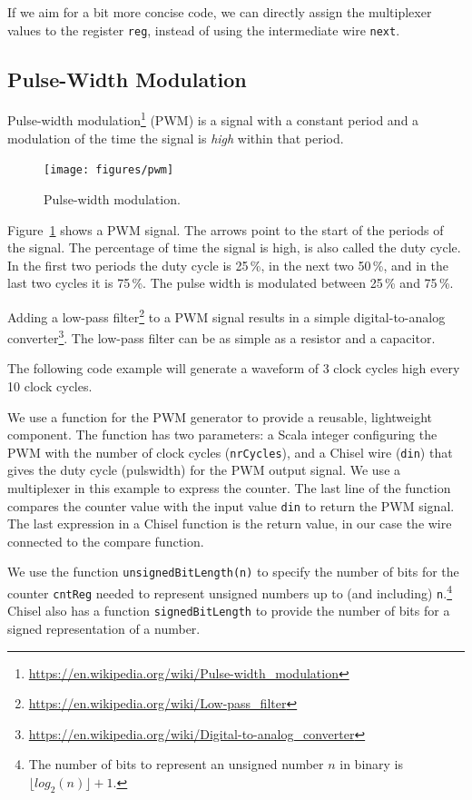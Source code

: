 \documentclass[%
    10pt,
    headinclude, footexclude,
    openright, %
    notitlepage,
    cleardoubleempty,
    headsepline,
    pointlessnumbers,
    bibtotoc, idxtotoc,
    ]{scrbook}
\newcommand{\code}[1]{{\small{\texttt{#1}}}}
\newcommand{\myref}[2]{\href{#1}{#2}}
\renewcommand{\myref}[2]{{#2}{\footnote{\url{#1}}}}
\begin{document}

If we aim for a bit more concise code, we can directly assign the multiplexer values to
the register \code{reg}, instead of using the intermediate wire \code{next}.

\subsection{Pulse-Width Modulation}

\myref{https://en.wikipedia.org/wiki/Pulse-width_modulation}{Pulse-width modulation} (PWM)
is a signal with a constant period and a modulation of the time the signal is \emph{high}
within that period.

\begin{figure}
  \centering
  \texttt{[image: figures/pwm]}
  \caption{Pulse-width modulation.}
  \label{fig:pwm}
\end{figure}

Figure~\ref{fig:pwm} shows a PWM signal. The arrows point to the start of the periods
of the signal. The percentage of time the signal is high, is also called the duty cycle.
In the first two periods the duty cycle is 25\,\%, in the next two 50\,\%, and in the last
two cycles it is 75\,\%. The pulse width is modulated between 25\,\% and 75\,\%.

Adding a \myref{https://en.wikipedia.org/wiki/Low-pass_filter}{low-pass filter} to a PWM
signal results in a simple
\myref{https://en.wikipedia.org/wiki/Digital-to-analog_converter}{digital-to-analog converter}.
The low-pass filter can be as simple as a resistor and a capacitor.

The following code example will generate a waveform of 3 clock cycles high every 10 clock cycles.


\noindent We use a function for the PWM generator to provide a reusable, lightweight component.
The function has two parameters: a Scala integer configuring the PWM with the number of
clock cycles (\code{nrCycles}), and a Chisel wire (\code{din}) that gives the duty cycle (pulswidth) for the
PWM output signal. We use a multiplexer in this
example to express the counter. The last line of the function compares the counter value
with the input value \code{din} to return the PWM signal. The last expression in a Chisel function
is the return value, in our case the wire connected to the compare function.

We use the function \code{unsignedBitLength(n)} to specify the number of bits for the counter
\code{cntReg} needed to represent unsigned numbers up to (and including)
\code{n}.\footnote{The number of bits to represent an unsigned number $n$ in binary is $\lfloor log_2(n) \rfloor + 1$.}
Chisel also has a function \code{signedBitLength} to provide the number of bits
for a signed representation of a number.
\end{document}
